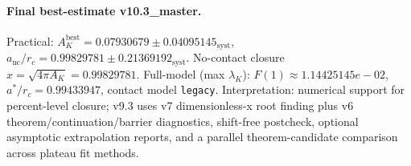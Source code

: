 \paragraph{Final best-estimate v10.3_master.}
Practical: $A_K^{\mathrm{best}} = 0.07930679 \pm 0.04095145_{\mathrm{syst}}$, $a_{\mathrm{nc}}/r_c = 0.99829781 \pm 0.21369192_{\mathrm{syst}}$.
No-contact closure $x = \sqrt{4\pi A_K} = 0.99829781$.
Full-model (max $\lambda_K$): $F(1) \approx 1.14425145e-02$, $a^*/r_c = 0.99433947$, contact model \texttt{legacy}.
Interpretation: numerical support for percent-level closure; v9.3 uses v7 dimensionless-x root finding plus v6 theorem/continuation/barrier diagnostics, shift-free postcheck, optional asymptotic extrapolation reports, and a parallel theorem-candidate comparison across plateau fit methods.
